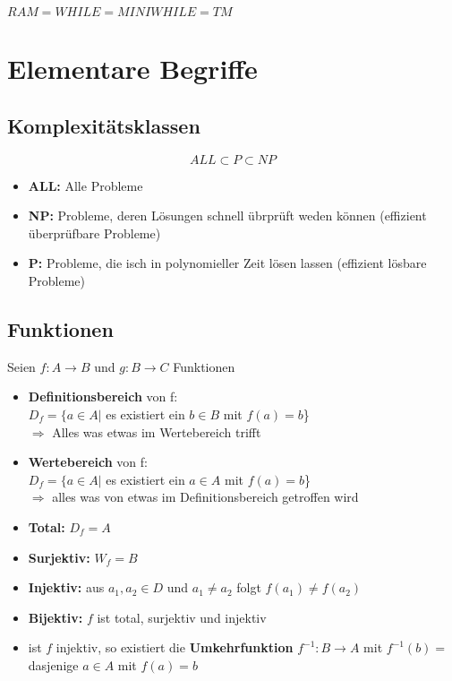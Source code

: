 \documentclass[14pt]{article}
\begin{document}
    \begin{definition}
        $RAM = WHILE = MINIWHILE = TM$
    \end{definition}
    \section{Elementare Begriffe}

        \subsection{Komplexitätsklassen}
        \[
            ALL \subset P \subset NP
        \]
        \begin{itemize}
            \item \textbf{ALL:} Alle Probleme
            \item \textbf{NP:} Probleme, deren Lösungen schnell übrprüft weden können
                (effizient überprüfbare Probleme)
            \item \textbf{P:} Probleme, die isch in polynomieller Zeit lösen lassen 
                (effizient lösbare Probleme)
        \end{itemize}

        \subsection{Funktionen}
        \begin{definition}[Funktionen]
            Seien $f: A \rightarrow B$ und $g : B \rightarrow C$ Funktionen
            \begin{itemize}
                \item \textbf{Definitionsbereich} von f: \\
                $D_f = \{a \in A |$ es existiert ein $ b \in B$ mit $f(a) = b$\} \\
                $\Rightarrow$ Alles was etwas im Wertebereich trifft
                \item \textbf{Wertebereich} von f: \\
                $D_f = \{a \in A |$ es existiert ein $ a \in A$ mit $f(a) = b$\} \\
                $\Rightarrow$ alles was von etwas im Definitionsbereich 
                getroffen wird
                \item \textbf{Total:} $D_f = A$
                \item \textbf{Surjektiv:} $W_f = B$
                \item \textbf{Injektiv:} aus $a_1, a_2 \in D$ und $a_1 \neq a_2$
                folgt $f(a_1) \neq f(a_2)$
                \item \textbf{Bijektiv:} $f$ ist total, surjektiv und injektiv
                \item ist $f$ injektiv, so existiert die \textbf{Umkehrfunktion}
                $f^{-1}: B \rightarrow A$ mit $f^{-1}(b) = $ dasjenige $a  \in A$
                mit $f(a) = b$
            \end{itemize}
        \end{definition}
\end{document}
